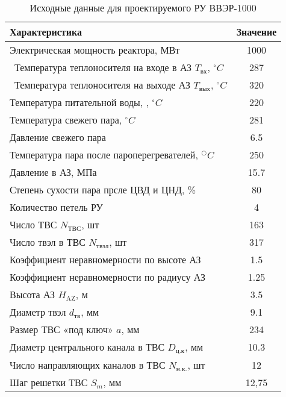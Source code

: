 \begin{table}[H]
	\caption{Исходные данные для проектируемого РУ ВВЭР-1000}
	\begin{center}
        \begin{tabular}{|l|c|}
        \toprule
         Характеристика & Значение \\ 
         \midrule
         \hline
         Электрическая мощность реактора, МВт & 1000 \\
         \hline\ 
         Температура теплоносителя на входе в АЗ $T_{\text{вх}}$, $^\circ C$  & 287 \\ 
         \hline\
         Температура теплоносителя на выходе АЗ $T_{\text{вых}}$, $^\circ C$ & 320 \\ 
         \hline
         Температура питательной воды, , $^\circ C$ & 220 \\ 
         \hline
         Температура свежего пара, $^\circ C$  &  281 \\ 
         \hline
         Давление свежего пара & 6.5 \\ 
         \hline
         Температура пара после пароперегревателей, $^○C$ & 250 \\ 
         \hline
         Давление в АЗ, МПа & 15.7 \\ 
         \hline
         Степень сухости пара прсле ЦВД и ЦНД, \% & 80 \\ 
         \hline
         Количество петель РУ & 4 \\ 
         \hline
         Число ТВС $N_{\text{ТВС}}$, шт  & 163 \\ 
         \hline
         Число твэл в ТВС $N_{\text{твэл}}$, шт & 317 \\ 
         \hline
         Коэффициент неравномерности по высоте АЗ  & 1.5 \\ 
         \hline
         Коэффициент неравномерности по радиусу АЗ & 1.25 \\ 
         \hline
         Высота АЗ $H_{\text{AZ}}$, м & 3.5 \\ 
         \hline
         Диаметр твэл $d_{\text{тв}}$, мм & 9.1 \\ 
         \hline
         Размер ТВС «под ключ» $a$, мм & 234 \\ 
         \hline
         Диаметр центрального канала в ТВС $D_{\text{ц.к}}$, мм & 10.3 \\ 
         \hline
         Число направляющих каналов в ТВС $N_{\text{н.к.}}$, шт & 12 \\ 
         \hline
         Шаг решетки ТВС $S_m$, мм & 12,75 \\ 

\end{tabular}
\end{center}
\end{table}
